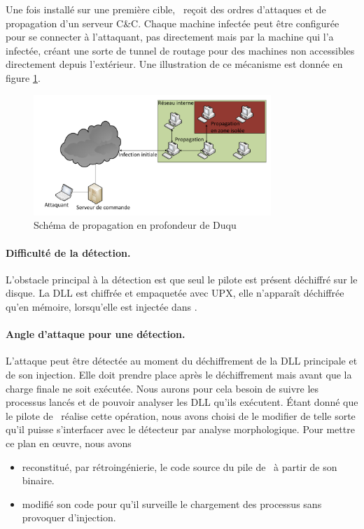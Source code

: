 Une fois installé sur une première cible, \duqu\ reçoit des ordres d'attaques et de propagation d'un serveur C\&C.
Chaque machine infectée peut être configurée pour se connecter à l'attaquant, pas directement mais par la machine qui l'a infectée, créant une sorte de tunnel de routage pour des machines non accessibles directement depuis l'extérieur. Une illustration de ce mécanisme est donnée en figure \ref{fig:propagationDuqu}.

\begin{figure}[h]
\begin{center}
 \includegraphics[width=0.8\textwidth]{supports/duqu/propagationDuqu.pdf}
\end{center}
\caption{Schéma de propagation en profondeur de Duqu}
\label{fig:propagationDuqu}
\end{figure}

\paragraph{Difficulté de la détection.}
L'obstacle principal à la détection est que seul le pilote est présent déchiffré sur le disque.
La DLL est chiffrée et empaquetée avec UPX, elle n'apparaît déchiffrée qu'en mémoire, lorsqu'elle est injectée dans \services.

\paragraph{Angle d'attaque pour une détection.}
L'attaque peut être détectée au moment du déchiffrement de la DLL principale et de son injection.
Elle doit prendre place après le déchiffrement mais avant que la charge finale ne soit exécutée.
Nous aurons pour cela besoin de suivre les processus lancés et de pouvoir analyser les DLL qu'ils exécutent.
Étant donné que le pilote de \duqu\ réalise cette opération, nous avons choisi de le modifier de telle sorte qu'il puisse s'interfacer avec le détecteur par analyse morphologique.
Pour mettre ce plan en \oe uvre, nous avons
\begin{itemize}
 \item reconstitué, par rétroingénierie, le code source du pile de \duqu\ à partir de son binaire.
 \item modifié son code pour qu'il surveille le chargement des processus sans provoquer d'injection.
\end{itemize}

